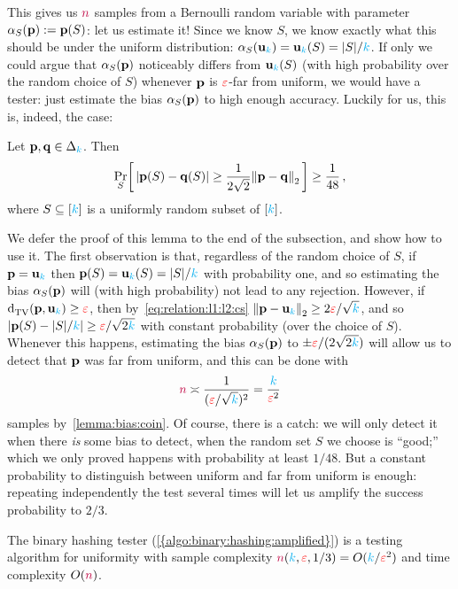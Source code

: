 This gives us ${\textcolor{purple}{n}}$ \iid samples from a Bernoulli random variable with parameter $\alpha_S(\mathbf{p}) := \mathbf{p}(S)$: let us estimate it! Since we know $S$, we know exactly what this should be under the uniform distribution: $\alpha_S(\uniform_\ab) = \uniform_\ab(S) = \abs{S}/\ab$. If only we could argue that $\alpha_S(\mathbf{p})$ noticeably differs from $\mathbf{u}_{\textcolor{cyan}{k}}(S)$ (with high probability over the random choice of $S$) whenever $\mathbf{p}$ is $\textcolor{red}{\varepsilon}$-far from uniform, we would have a tester: just estimate the bias $\alpha_S(\mathbf{p})$ to high enough accuracy. Luckily for us, this is, indeed, the case:
\begin{lemma}
  \label{lemma:random:binary:hashing}
  Let $\mathbf{p},\mathbf{q}\in\Delta_{{\textcolor{cyan}{k}}}$. Then
  \[
        \probaDistrOf{S}{ |\p(S)-\q(S)| \geq \frac{1}{2\sqrt{2}}\normtwo{\p-\q} } \geq \frac{1}{48}\,,
  \] 
  where $S\subseteq[{\textcolor{cyan}{k}}]$ is a uniformly random subset of $[{\textcolor{cyan}{k}}]$.
\end{lemma}
We defer the proof of this lemma to the end of the subsection, and show how to use it. The first observation is that, regardless of the random choice of $S$, if $\mathbf{p}=\mathbf{u}_{\textcolor{cyan}{k}}$ then $\mathbf{p}(S) = \mathbf{u}_{\textcolor{cyan}{k}}(S) = |S|/{\textcolor{cyan}{k}}$ with probability one, and so estimating the bias $\alpha_S(\mathbf{p})$ will (with high probability) not lead to any rejection. However, if $\totalvardist{\p}{\uniform_\ab}\geq \dst$, then by~\cref{eq:relation:l1:l2:cs} $\normtwo{\p-\uniform_\ab} \geq 2\dst/\sqrt{\ab}$, and so 
$|\mathbf{p}(S)-|S|/{\textcolor{cyan}{k}}| \geq \textcolor{red}{\varepsilon}/\sqrt{2{\textcolor{cyan}{k}}}$ with constant probability (over the choice of $S$). Whenever this happens, estimating the bias $\alpha_S(\mathbf{p})$ to $\pm \textcolor{red}{\varepsilon}/(2\sqrt{2{\textcolor{cyan}{k}}})$ will allow us to detect that $\mathbf{p}$ was far from uniform, and this can be done with
\[
    {\textcolor{purple}{n}} \asymp \frac{1}{(\textcolor{red}{\varepsilon}/\sqrt{{\textcolor{cyan}{k}}})^2} = \frac{{\textcolor{cyan}{k}}}{\textcolor{red}{\varepsilon}^2}
\]
samples by~\cref{lemma:bias:coin}. Of course, there is a catch: we will only detect it when there \emph{is} some bias to detect, \ie when the random set $S$ we choose is ``good;'' which we only proved happens with probability at least $1/48$. But a constant probability to distinguish between uniform and far from uniform is enough: repeating independently the test several times will let us amplify the success probability to $2/3$.
\begin{theorem}
The binary hashing tester (\cref{{algo:binary:hashing:amplified}}) is a testing algorithm for uniformity with sample complexity ${\textcolor{purple}{n}}({\textcolor{cyan}{k}},\textcolor{red}{\varepsilon},1/3) = O({\textcolor{cyan}{k}}/\textcolor{red}{\varepsilon}^2)$ and time complexity $O({\textcolor{purple}{n}})$.
\end{theorem}
